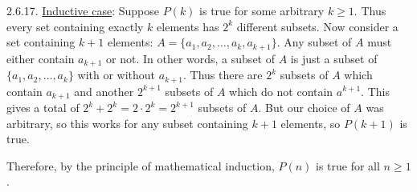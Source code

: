 \begin {itemize}
\begin{ans}{2.6.17.}
		\underline{Inductive case}: Suppose $P(k)$ is true for some arbitrary $k \ge 1$.  Thus every set containing exactly $k$ elements has $2^k$ different subsets.  Now consider a set containing $k+1$ elements: $A = \{a_1, a_2, \ldots, a_k, a_{k+1}\}$.  Any subset of $A$ must either contain $a_{k+1}$ or not.  In other words, a subset of $A$ is just a subset of $\{a_1, a_2,\ldots, a_k\}$ with or without $a_{k+1}$.  Thus there are $2^k$ subsets of $A$ which contain $a_{k+1}$ and another $2^{k+1}$ subsets of $A$ which do not contain $a^{k+1}$.  This gives a total of $2^k + 2^k = 2\cdot 2^k = 2^{k+1}$ subsets of $A$.  But our choice of $A$ was arbitrary, so this works for any subset containing $k+1$ elements, so $P(k+1)$ is true.

		Therefore, by the principle of mathematical induction, $P(n)$ is true for all $n \ge 1$.
	
\end{ans}
\protect \end {itemize}
